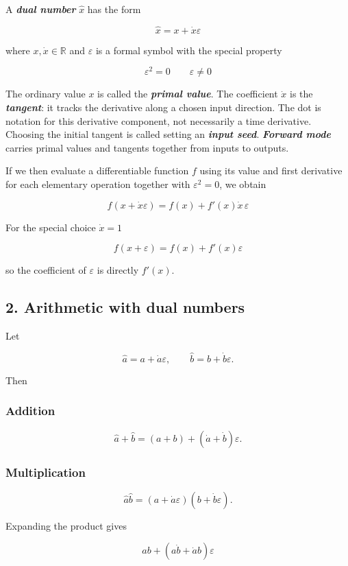 \documentclass[10pt]{article}
\begin{document}
A \textbf{\textit{dual number}} $\hat{x}$ has the form

\[
\hat{x} = x + \dot{x}\varepsilon
\]

where $x,\dot{x}\in\mathbb{R}$ and $\varepsilon$ is a formal symbol with the special property

\[
\varepsilon^2 = 0
\qquad
\varepsilon \neq 0
\]

The ordinary value $x$ is called the \textbf{\textit{primal value}}. The coefficient $\dot{x}$ is the \textbf{\textit{tangent}}: it tracks the derivative along a chosen input direction. The dot is notation for this derivative component, not necessarily a time derivative. Choosing the initial tangent is called setting an \textbf{\textit{input seed}}. \textbf{\textit{Forward mode}} carries primal values and tangents together from inputs to outputs.

If we then evaluate a differentiable function $f$ using its value and first derivative for each elementary operation together with $\varepsilon^2=0$, we obtain

\[
f(x+\dot{x}\varepsilon)
= f(x) + f'(x)\dot{x}\,\varepsilon
\]

For the special choice $\dot{x}=1$

\[
f(x+\varepsilon)=f(x)+f'(x)\varepsilon
\]

so the coefficient of $\varepsilon$ is directly $f'(x)$.

\subsection*{2. Arithmetic with dual numbers}
Let

\[
\hat{a}=a+\dot{a}\varepsilon,
\qquad
\hat{b}=b+\dot{b}\varepsilon.
\]

Then

\subsubsection*{Addition}
\[
\hat{a}+\hat{b}
=(a+b)+(\dot{a}+\dot{b})\varepsilon.
\]

\subsubsection*{Multiplication}
\[
\hat{a}\hat{b}
=(a+\dot{a}\varepsilon)(b+\dot{b}\varepsilon).
\]

Expanding the product gives

\[
ab+(a\dot{b}+\dot{a}b)\varepsilon
\]
\end{document}
